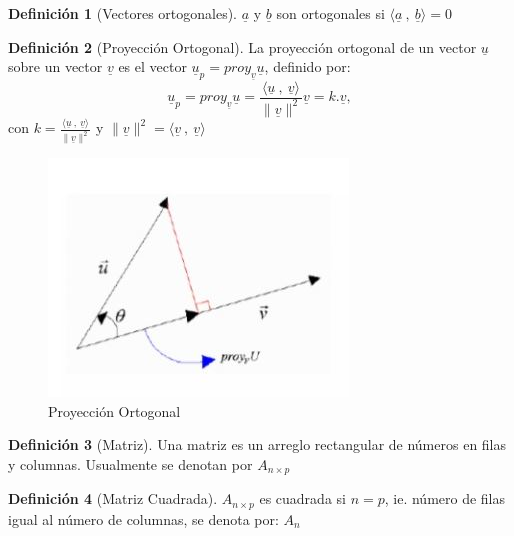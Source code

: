 \documentclass[
]{book}
\theoremstyle{definition}
\newtheorem{definition}{Definición}[chapter]
\theoremstyle{definition}
\theoremstyle{definition}
\theoremstyle{definition}
\theoremstyle{remark}
\begin{document}
\begin{definition}[Vectores ortogonales]
\protect\hypertarget{def:vect-ortog}{}\label{def:vect-ortog}\(\underline{a}\) y \(\underline{b}\) son ortogonales si \(\langle \underline{a}\ , \ \underline{b} \rangle=0\)
\end{definition}

\begin{definition}[Proyección Ortogonal]
\protect\hypertarget{def:proyec-ortog}{}\label{def:proyec-ortog}La proyección ortogonal de un vector \(\underline{u}\) sobre un vector \(\underline{v}\) es el vector \(\underline{u}_p=proy_{\underline{v}}\underline{u}\), definido por:
\[
\underline{u}_p=proy_{\underline{v}}\underline{u}=\frac{\langle  \underline{u}\ , \ \underline{v} \rangle}{\|\underline{v}\|^2}\underline{v}=k.\underline{v},
\]
con \(k=\frac{\langle \underline{u}\ , \ \underline{v} \rangle}{\|\underline{v}\|^2}\) y \(\|\underline{v}\|^2=\langle \underline{v}\ , \ \underline{v} \rangle\)
\end{definition}

\begin{figure}

{\centering \includegraphics[width=0.5\linewidth]{imagenes/proyeccion} 

}

\caption{Proyección Ortogonal}\label{fig:graf-proy-ortog}
\end{figure}

\begin{definition}[Matriz]
\protect\hypertarget{def:matriz}{}\label{def:matriz}Una matriz es un arreglo rectangular de números en filas y columnas. Usualmente se denotan por \(A_{n \times p}\)
\end{definition}

\begin{definition}[Matriz Cuadrada]
\protect\hypertarget{def:matriz-cuad}{}\label{def:matriz-cuad}\(A_{n \times p}\) es cuadrada si \(n=p\), ie. número de filas igual al número de columnas, se denota por: \(A_n\)
\end{definition}
\end{document}
